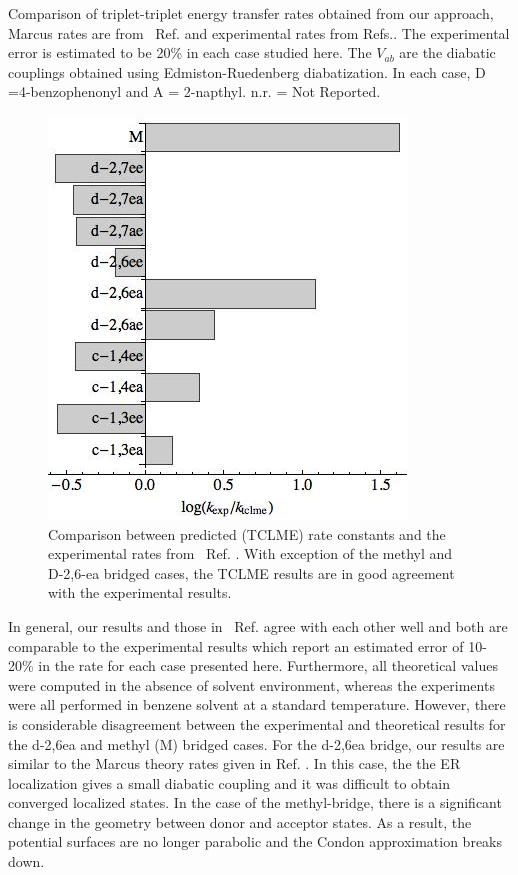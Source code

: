 \begin{table}
\begin{centering}
\par\end{centering}
\caption{Comparison of triplet-triplet energy transfer rates obtained from our  approach,  Marcus rates are
from ~Ref. \cite{subotnik2010predicting}
and experimental rates from Refs.\cite{closs1988determination,closs1989connection}.   The experimental error is estimated to be 20\% in each
case studied here.
The $V_{ab}$ are the diabatic couplings obtained using  Edmiston-Ruedenberg diabatization.
In each case, D =4-benzophenonyl and A = 2-napthyl.  n.r. = Not Reported.
}
\label{summarytable}
\end{table}



\begin{figure}[t]
\includegraphics[width=0.5\columnwidth]{Chapters/chap2/Figure3}
\caption{Comparison between predicted (TCLME) rate constants and the experimental rates from ~Ref. \cite{miller1984intramolecular}.  With exception of
the methyl and D-2,6-ea bridged cases, the TCLME results are in good agreement with the experimental results.  }\label{compare}
\end{figure}


In general, our results and those in ~Ref. \cite{subotnik2010predicting} agree with each other well and both are
comparable to the experimental results which report an estimated error of 10-20\% in the
rate for each case presented here.  Furthermore,  all theoretical values were computed
in the absence of solvent environment, whereas the experiments were all performed in benzene solvent at a standard temperature.
However,  there is considerable disagreement between the experimental and theoretical results for
the d-2,6ea and methyl (M) bridged cases.   For the d-2,6ea bridge,  our results are similar to the
Marcus theory rates given in Ref. \cite{subotnik2010predicting}.  In this case, the
 the ER localization gives a  small diabatic coupling
 and it was  difficult to obtain converged localized states.
In the case of the methyl-bridge,  there is a significant change in the geometry between donor and acceptor states.
As a result,  the potential surfaces are no longer parabolic
and the Condon approximation breaks down.\cite{subotnik2010predicting}








